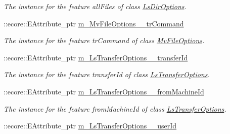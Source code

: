 \begin{DoxyCompactItemize}
\begin{DoxyCompactList}\small\item\em The instance for the feature allFiles of class \hyperlink{classFMS__Data_1_1LsDirOptions}{LsDirOptions}. \item\end{DoxyCompactList}\item 
\hypertarget{classFMS__Data_1_1FMS__DataPackage_add73a6d57625bbecbf31577aa5487c25}{
::ecore::EAttribute\_\-ptr \hyperlink{classFMS__Data_1_1FMS__DataPackage_add73a6d57625bbecbf31577aa5487c25}{m\_\-MvFileOptions\_\-\_\-trCommand}}
\label{classFMS__Data_1_1FMS__DataPackage_add73a6d57625bbecbf31577aa5487c25}

\begin{DoxyCompactList}\small\item\em The instance for the feature trCommand of class \hyperlink{classFMS__Data_1_1MvFileOptions}{MvFileOptions}. \item\end{DoxyCompactList}\item 
\hypertarget{classFMS__Data_1_1FMS__DataPackage_a89528883770f2085675154d2b95ba757}{
::ecore::EAttribute\_\-ptr \hyperlink{classFMS__Data_1_1FMS__DataPackage_a89528883770f2085675154d2b95ba757}{m\_\-LsTransferOptions\_\-\_\-transferId}}
\label{classFMS__Data_1_1FMS__DataPackage_a89528883770f2085675154d2b95ba757}

\begin{DoxyCompactList}\small\item\em The instance for the feature transferId of class \hyperlink{classFMS__Data_1_1LsTransferOptions}{LsTransferOptions}. \item\end{DoxyCompactList}\item 
\hypertarget{classFMS__Data_1_1FMS__DataPackage_ac5e23247ccd678338ed3e6d10a984cc0}{
::ecore::EAttribute\_\-ptr \hyperlink{classFMS__Data_1_1FMS__DataPackage_ac5e23247ccd678338ed3e6d10a984cc0}{m\_\-LsTransferOptions\_\-\_\-fromMachineId}}
\label{classFMS__Data_1_1FMS__DataPackage_ac5e23247ccd678338ed3e6d10a984cc0}

\begin{DoxyCompactList}\small\item\em The instance for the feature fromMachineId of class \hyperlink{classFMS__Data_1_1LsTransferOptions}{LsTransferOptions}. \item\end{DoxyCompactList}\item 
\hypertarget{classFMS__Data_1_1FMS__DataPackage_ac54f00d20aaced74efe305602a22539c}{
::ecore::EAttribute\_\-ptr \hyperlink{classFMS__Data_1_1FMS__DataPackage_ac54f00d20aaced74efe305602a22539c}{m\_\-LsTransferOptions\_\-\_\-userId}}
\label{classFMS__Data_1_1FMS__DataPackage_ac54f00d20aaced74efe305602a22539c}


\end{DoxyCompactItemize}

